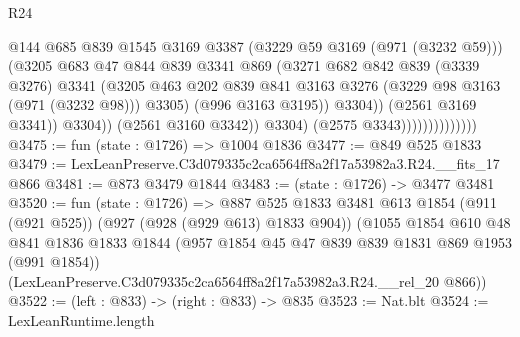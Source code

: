\begin{lexlean}{R24}
\begin{coremodule}
                                          @144
                                          @685
                                          @839
                                          @1545
                                          @3169
                                          @3387
                                          (@3229 @59 @3169 (@971 (@3232 @59)))
                                          (@3205
                                            @683
                                            @47
                                            @844
                                            @839
                                            @3341
                                            @869
                                            (@3271
                                              @682
                                              @842
                                              @839
                                              (@3339 @3276)
                                              @3341
                                              (@3205
                                                @463
                                                @202
                                                @839
                                                @841
                                                @3163
                                                @3276
                                                (@3229 @98 @3163 (@971 (@3232 @98)))
                                                @3305)
                                              (@996 @3163 @3195))
                                            @3304))
                                        (@2561 @3169 @3341))
                                      @3304))
                                  (@2561 @3160 @3342))
                                @3304)
                              (@2575 @3343))))))))))))))
@3475 := fun (state : @1726) => @1004 @1836
@3477 := @849 @525 @1833
@3479 := LexLeanPreserve.C3d079335c2ca6564ff8a2f17a53982a3.R24.__fits_17 @866
@3481 := @873 @3479 @1844
@3483 := (state : @1726) -> @3477 @3481
@3520 := fun (state : @1726) =>
  @887
    @525
    @1833
    @3481
    @613
    @1854
    (@911 (@921 @525))
    (@927 (@928 (@929 @613) @1833 @904))
    (@1055
      @1854
      @610
      @48
      @841
      @1836
      @1833
      @1844
      (@957 @1854 @45 @47 @839 @839 @1831 @869 @1953 (@991 @1854))
      (LexLeanPreserve.C3d079335c2ca6564ff8a2f17a53982a3.R24.__rel_20 @866))
@3522 := (left : @833) -> (right : @833) -> @835
@3523 := Nat.blt
@3524 := LexLeanRuntime.length

\end{coremodule}
\end{lexlean}
